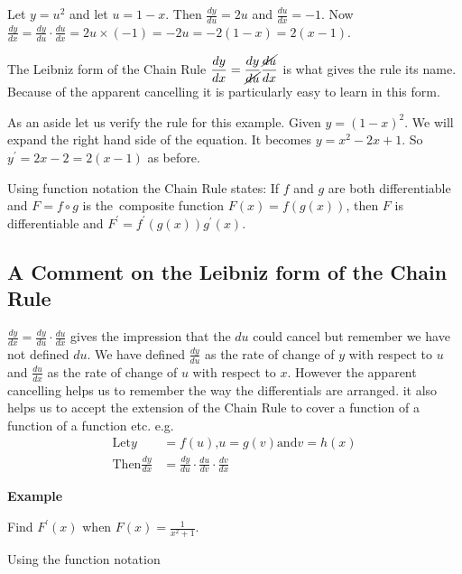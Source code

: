 Let
$y =u^{2}$ and let $u =1 -x$. Then $\frac{d y}{d u} =2 u$ and $\frac{d u}{d x} = -1$. Now $\frac{d y}{d x} =\frac{d y}{d u} \cdot \frac{d u}{d x} =2 u \times ( -1) = -2 u = -2 (1 -x) =2 (x -1)$. 

The Leibniz form of the Chain Rule $\displaystyle \frac{d y}{d x} =\frac{d y}{\cancel{d u}} \frac{\cancel{d u}}{d x}$ is what gives the rule its name. Because of the apparent cancelling it is particularly
easy to learn in this form. 

As an aside let us verify the rule for this example. Given
$y =(1 -x)^{2}$. We will expand the right hand side of the equation. It
becomes $y =x^{2} -2 x +1$. So $y^{ \prime } =2 x -2 =2 (x -1)$ as before. 

Using function notation the Chain Rule states: If $f$ and $g$ are both differentiable and $F =f \circ g$ is the\ composite function $F (x) =f (g (x))$, then $F$ is differentiable and $F^{ \prime } =f^{ \prime } (g (x)) g^{ \prime } (x)$. 

\subsection*{A Comment on the Leibniz form of the Chain Rule}
$\frac{d y}{d x} =\frac{d y}{d u} \cdot \frac{d u}{d x}$ gives the impression that the $d u$ could cancel but remember we have not defined $d u$. We have defined $\frac{d y}{d u}$ as the rate of change of $y$ with respect to $u$ and $\frac{d u}{d x}$ as the rate of change of $u$ with respect to $x$. However the apparent cancelling helps us to remember the way the differentials
are arranged. it also helps us to accept the extension of the Chain Rule to cover a function of a function of
a function etc. e.g.
\begin{align*}\text{Let}y &  = f (u)\text{,}u =g (v)\text{and}v =h (x) \\
\text{Then}\frac{d y}{d x} &  = \frac{d y}{d u} \cdot \frac{d u}{d v} \cdot \frac{d v}{d x}\end{align*}

\textbf{Example} 

Find $F^{ \prime } (x)$ when $F (x) =\frac{1}{x^{2} +1}$. 

Using the function notation 

